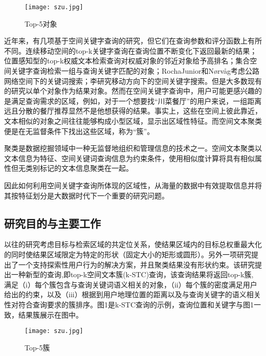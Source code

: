 \begin{figure}[htbp]
	\begin{center}
		\texttt{[image: szu.jpg]}
		\caption{Top-5对象}
		\label{top5object}
	\end{center}
\end{figure}

近年来，有几项基于空间关键字查询的研究，但它们在查询参数和评分函数上有所不同。连续移动空间的top-k关键字查询在查询位置不断变化下返回最新的结果；位置感知型的top-k权威文本检索查询对权威对象的邻近对象给予高排名；集合空间关键字查询检索一组与查询关键字匹配的对象；RochaJunior和Nørvåg考虑公路网络空间下的关键词搜索；李研究移动方向下的空间关键字搜索。但是大多数现有的研究以单个对象作为结果对象。然而在空间关键字查询中，用户可能更感兴趣的是满足查询需求的区域，例如，对于一个想要找“川菜餐厅”的用户来说，一组距离远且分散的餐厅推荐显然不是他想获得的结果。事实上，这些在空间上彼此靠近，文本相似的对象之间往往能够构成小型区域，显示出区域性特征。而空间文本聚类便是在无监督条件下找出这些区域，称为“簇”。

聚类是数据挖掘领域中一种无监督地组织和管理信息的技术之一。空间文本聚类以文本信息为特征、空间关键词查询信息为约束条件，使用相似度计算将具有相似属性但无类别标记的文本信息聚类在一起。

因此如何利用空间关键字查询所体现的区域性，从海量的数据中有效提取信息并将其按特征划分是大数据时代下一个重要的研究问题。

\subsection{研究目的与主要工作}
以往的研究考虑目标与检索区域的共定位关系，使结果区域内的目标总权重最大化的同时使结果区域限定为特定的形状（固定大小的矩形或圆形）。另外一项研究提出了一个支持探索性用户行为的解决方案，并且聚类结果没有形状约束。该研究提出一种新型的查询,即top-k空间文本簇(k-STC)查询，该查询结果将返回top-k簇, 满足（i）每个簇包含与查询关键词语义相关的对象，（ii）每个簇的密度满足用户给出的约束，以及（iii）根据到用户地理位置的距离以及与查询关键字的语义相关性对符合查询要求的簇排序。图1是k-STC查询的示例，查询位置和关键字与图1一致，结果簇展示在图中。
\begin{figure}[htbp]
	\begin{center}
		\texttt{[image: szu.jpg]}
		\caption{Top-5簇}
		\label{top5cluster}
	\end{center}
\end{figure}

